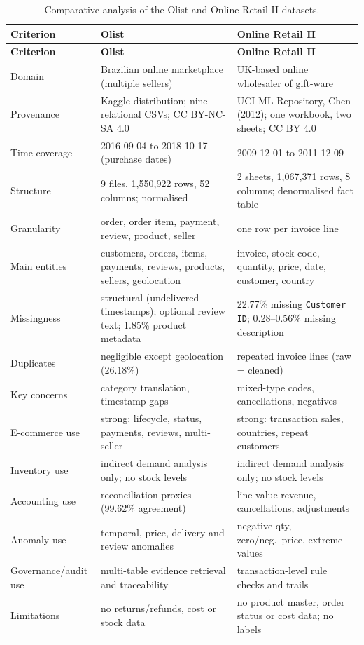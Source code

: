\documentclass[11pt,a4paper]{article}
\newcommand{\code}[1]{\texttt{#1}}
\begin{document}
\begin{longtable}{L{3.1cm}L{6.0cm}L{6.0cm}}
\caption{Comparative analysis of the Olist and Online Retail II datasets.}\label{tab:comparison}\\
\toprule
\textbf{Criterion} & \textbf{Olist} & \textbf{Online Retail II} \\
\midrule
\endfirsthead
\toprule
\textbf{Criterion} & \textbf{Olist} & \textbf{Online Retail II} \\
\midrule
\endhead
\footnotesize
Domain & Brazilian online marketplace (multiple sellers) & UK-based online wholesaler of gift-ware \\
Provenance & Kaggle distribution; nine relational CSVs; CC BY-NC-SA 4.0 & UCI ML Repository, Chen (2012); one workbook, two sheets; CC BY 4.0 \\
Time coverage & 2016-09-04 to 2018-10-17 (purchase dates) & 2009-12-01 to 2011-12-09 \\
Structure & 9 files, 1{,}550{,}922 rows, 52 columns; normalised & 2 sheets, 1{,}067{,}371 rows, 8 columns; denormalised fact table \\
Granularity & order, order item, payment, review, product, seller & one row per invoice line \\
Main entities & customers, orders, items, payments, reviews, products, sellers, geolocation & invoice, stock code, quantity, price, date, customer, country \\
Missingness & structural (undelivered timestamps); optional review text; 1.85\% product metadata & 22.77\% missing \code{Customer ID}; 0.28--0.56\% missing description \\
Duplicates & negligible except geolocation (26.18\%) & repeated invoice lines (raw = cleaned) \\
Key concerns & category translation, timestamp gaps & mixed-type codes, cancellations, negatives \\
E-commerce use & strong: lifecycle, status, payments, reviews, multi-seller & strong: transaction sales, countries, repeat customers \\
Inventory use & indirect demand analysis only; no stock levels & indirect demand analysis only; no stock levels \\
Accounting use & reconciliation proxies (99.62\% agreement) & line-value revenue, cancellations, adjustments \\
Anomaly use & temporal, price, delivery and review anomalies & negative qty, zero/neg.\ price, extreme values \\
Governance/audit use & multi-table evidence retrieval and traceability & transaction-level rule checks and trails \\
Limitations & no returns/refunds, cost or stock data & no product master, order status or cost data; no labels \\
\bottomrule
\end{longtable}
\end{document}
